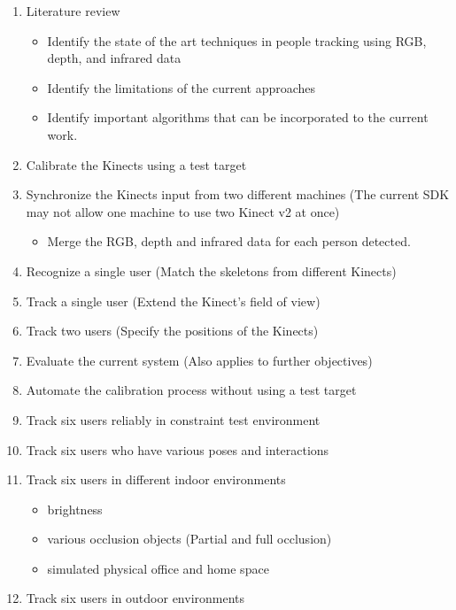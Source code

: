 \documentclass[paper=a4, fontsize=11pt]{scrartcl}
\numberwithin{equation}{section}
\numberwithin{figure}{section}
\numberwithin{table}{section}
\begin{document}
\begin{enumerate}[topsep=0pt,itemsep=0ex,partopsep=1ex,parsep=1ex]
\item Literature review
	\begin{itemize}[topsep=0pt,itemsep=0ex,partopsep=1ex,parsep=1ex]
		\item Identify the state of the art techniques in people tracking using RGB, depth, and infrared data
		\item Identify the limitations of the current approaches
		\item Identify important algorithms that can be incorporated to the current work.
	\end{itemize}
\item Calibrate the Kinects using a test target
\item Synchronize the Kinects input from two different machines (The current SDK may not allow one machine to use two Kinect v2 at once)
	\begin{itemize}[topsep=0pt,itemsep=0ex,partopsep=1ex,parsep=1ex]
		\item Merge the RGB, depth and infrared data for each person detected.
	\end{itemize}
\item Recognize a single user (Match the skeletons from different Kinects)
\item Track a single user (Extend the Kinect's field of view)
\item Track two users (Specify the positions of the Kinects)
\item Evaluate the current system (Also applies to further objectives)
\item Automate the calibration process without using a test target
\item Track six users reliably in constraint test environment
\item Track six users who have various poses and interactions
\item Track six users in different indoor environments
	\begin{itemize}[topsep=0pt,itemsep=0ex,partopsep=1ex,parsep=1ex]
		\item brightness
		\item various occlusion objects (Partial and full occlusion)
		\item simulated physical office and home space
	\end{itemize}
\item Track six users in outdoor environments
\end{enumerate}
\end{document}
